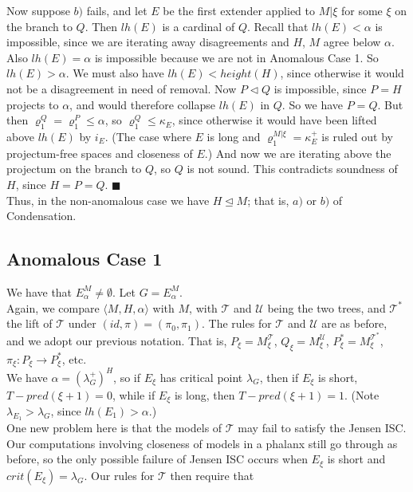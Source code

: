 \documentclass[12pt]{article}
\begin{document}
Now suppose $b)$ fails, and let $E$ be the first extender applied to $M | \xi$ for some $\xi$ on the branch to $Q$.  Then $lh(E)$ is a cardinal of $Q$.  Recall that $lh(E) < \alpha$ is impossible, since we are iterating away disagreements and $H$, $M$ agree below $\alpha$.  Also $lh(E) = \alpha$ is impossible because we are not in Anomalous Case 1.  So $lh(E) > \alpha$.  We must also have $lh(E) < height(H)$, since otherwise it would not be a disagreement in need of removal.  Now $P \lhd Q$ is impossible, since $P = H$ projects to $\alpha$, and would therefore collapse $lh(E)$ in $Q$.  So we have $P = Q$.  But then $\varrho_1^Q = \varrho_1^P \leq \alpha$, so $\varrho_1^Q \leq \kappa_E$, since otherwise it would have been lifted above $lh(E)$ by $i_E$.  (The case where $E$ is long and $\varrho_1^{M | \xi} = \kappa_E^+$ is ruled out by projectum-free spaces and closeness of $E$.)  And now we are iterating above the projectum on the branch to $Q$, so $Q$ is not sound.  This contradicts soundness of $H$, since $H = P = Q$. $\blacksquare$\\

Thus, in the non-anomalous case we have $H \unlhd M$; that is, $a)$ or $b)$ of Condensation.\\


\subsection{Anomalous Case 1}

We have that $E_\alpha^M \neq \emptyset$.  Let $G = E_\alpha^M$.\\

Again, we compare $ \langle M, H, \alpha \rangle$ with $M$, with $\mathscr{T}$ and $\mathscr{U}$ being the two trees, and $\mathscr{T}^*$ the lift of $\mathscr{T}$ under $(id, \pi ) = (\pi_0 , \pi_1 )$.  The rules for $\mathscr{T}$ and $\mathscr{U}$ are as before, and we adopt our previous notation.  That is, $P_\xi = M_\xi^{\mathscr{T} }$, $Q_\xi = M_\xi^{\mathscr{U}}$, $P_\xi^* = M_\xi^{\mathscr{T}^*}$, $\pi_\xi : P_\xi \longrightarrow P_\xi^*$, etc.\\

We have $\alpha = (\lambda_G^+ )^H$, so if $E_\xi$ has critical point $\lambda_G$, then if $E_\xi$ is short, $T-pred (\xi + 1 ) = 0$, while if $E_\xi$ is long, then $T-pred (\xi + 1) = 1$.  (Note $\lambda_{E_1} > \lambda_G$, since $lh(E_1) > \alpha$.)\\

One new problem here is that the models of $\mathscr{T}$ may fail to satisfy the Jensen ISC.  Our computations involving closeness of models in a phalanx still go through as before, so the only possible failure of Jensen ISC occurs when $E_\xi$ is short and $crit(E_\xi) = \lambda_G$.  Our rules for $\mathscr{T}$ then require that\\
\end{document}
